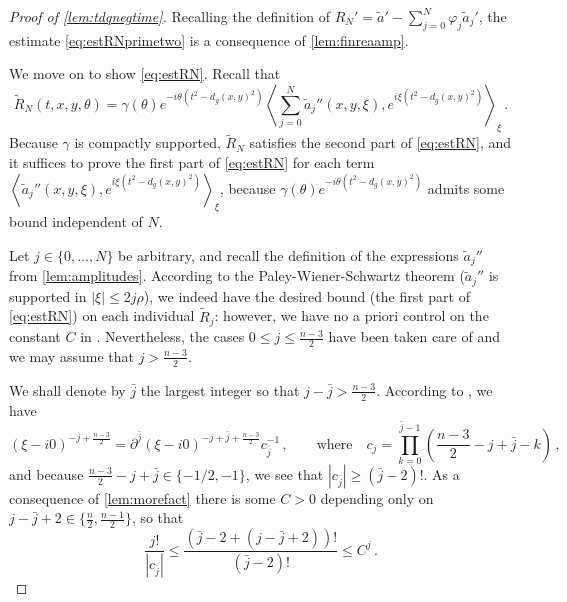 \documentclass[
	fontsize=11pt, 
	twoside=false, 
	abstract=true, 
	a4paper,
]{scrartcl}
\newcommand{\abs}[1]{\left\lvert#1\right\rvert}
\newcommand{\del}{\partial}
\newcommand{\td}[1]{\tilde{#1}}
\begin{document}
\begin{proof}[Proof of \cref{lem:tdqnegtime}]
	Recalling the definition of $R_N' = \td{a}' - \sum_{j=0}^N \varphi_j\td{a}_j'$, the estimate \cref{eq:estRNprimetwo} is a consequence of \cref{lem:finreaamp}.
	
	We move on to show \cref{eq:estRN}. Recall that
		\[
			\td{R}_N(t,x,y,\theta)=\gamma(\theta) e^{-i\theta(t^2-d_g(x,y)^2)} \left\langle \sum_{j=0}^N \td{a}_j''(x,y,\xi), e^{i\xi(t^2-d_g(x,y)^2)}\right\rangle_\xi\,.
		\]
		Because $\gamma$ is compactly supported, $\td{R}_N$ satisfies the second part of \cref{eq:estRN}, and it suffices to prove the first part of \cref{eq:estRN} for each term $\left\langle\td{a}_j''(x,y,\xi), e^{i\xi(t^2-d_g(x,y)^2)}\right\rangle_\xi$, because $\gamma(\theta) e^{-i\theta(t^2-d_g(x,y)^2)}$ admits some bound independent of $N$.
	
		Let $j\in \{0,\dots,N\}$ be arbitrary, and recall the definition of the expressions $\td{a}_j''$ from \cref{lem:amplitudes}. According to the Paley-Wiener-Schwartz theorem \cite[Thm.~7.3.1]{hoermander1} ($\td{a}_j''$ is supported in $\abs{\xi} \leq 2j\rho$), we indeed have the desired bound (the first part of \cref{eq:estRN}) on each individual $\td{R}_j$: however, we have no a priori control on the constant $C$ in \cite[Eq.~(7.3.2)]{hoermander1}. Nevertheless, the cases $0 \leq j \leq \frac{n-3}{2}$ have been taken care of and we may assume that $j> \frac{n-3}{2}$. 

		We shall denote by $\bar j$ the largest integer so that $j - \bar j > \frac{n-3}{2}$. According to \cite[Eq.~(3.2.12)]{hoermander1}, we have
		\begin{equation}\label{eq:i0deriv}
			(\xi-i0)^{-j+\frac{n-3}{2}} = \del^{\bar j}(\xi-i0)^{-j+\bar j + \frac{n-3}{2}} c_{\bar j}^{-1}\,,\qquad\text{where}\quad c_j = \prod_{k=0}^{\bar j-1} \left(\frac{n-3}{2} -j+\bar j - k\right)\,,
		\end{equation}
		and because $\frac{n-3}{2}-j+\bar j \in \{-1/2,-1\}$, we see that $\abs{c_{\bar j}} \geq (\bar j-2)!$. As a consequence of \cref{lem:morefact} there is some $C>0$ depending only on $j-\bar j+2 \in \{\frac{n}{2},\frac{n-1}{2}\}$, so that
		\begin{equation}\label{eq:barj}
			\frac{j!}{\abs{c_{\bar j}}} \leq \frac{(\bar j - 2 + (j-\bar j +2))!}{(\bar j -2)!} \leq C^j\,.
		\end{equation}


\end{proof}
\end{document}
